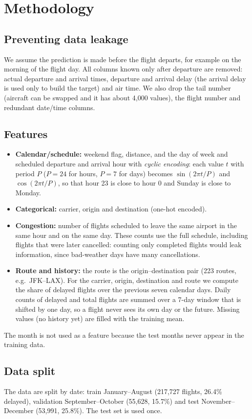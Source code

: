 \documentclass[conference]{IEEEtran}
\begin{document}
\section{Methodology}
\subsection{Preventing data leakage}
We assume the prediction is made before the flight departs, for example on the morning of the flight day. All
columns known only after departure are removed: actual departure and arrival times, departure and arrival delay
(the arrival delay is used only to build the target) and air time. We also drop the tail number (aircraft can be
swapped and it has about 4{,}000 values), the flight number and redundant date/time columns.

\subsection{Features}
\begin{itemize}
\item \textbf{Calendar/schedule:} weekend flag, distance, and the day of week and scheduled departure and arrival
hour with \emph{cyclic encoding}: each value $t$ with period $P$ ($P=24$ for hours, $P=7$ for days) becomes
$\sin(2\pi t/P)$ and $\cos(2\pi t/P)$, so that hour 23 is close to hour 0 and Sunday is close to Monday.
\item \textbf{Categorical:} carrier, origin and destination (one-hot encoded).
\item \textbf{Congestion:} number of flights scheduled to leave the same airport in the same hour and on the same day.
These counts use the full schedule, including flights that were later cancelled: counting only completed flights
would leak information, since bad-weather days have many cancellations.
\item \textbf{Route and history:} the route is the origin--destination pair (223 routes, e.g.\ JFK--LAX). For
the carrier, origin, destination and route we compute the share of delayed flights over the previous seven
calendar days. Daily counts of delayed and total flights are summed over a 7-day window that is shifted by
one day, so a flight never sees its own day or the future. Missing values (no history yet) are filled with the training mean.
\end{itemize}
The month is not used as a feature because the test months never appear in the training data.

\subsection{Data split}
The data are split by date: train January--August (217{,}727 flights, 26.4\% delayed), validation
September--October (55{,}628, 15.7\%) and test November--December (53{,}991, 25.8\%). The test set is used once.
\end{document}
